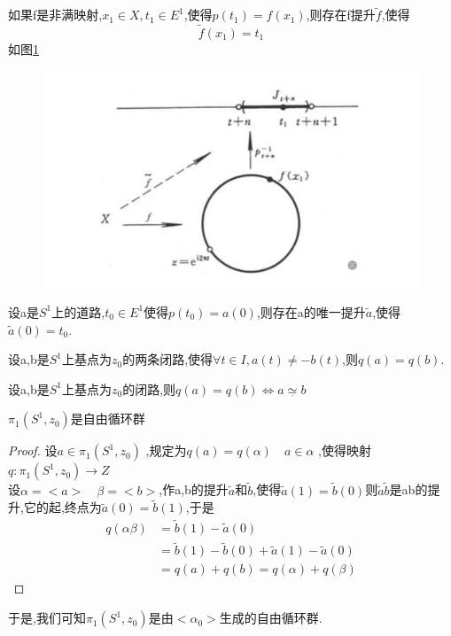 \begin{lemma}
    如果f是非满映射,\(x_1 \in X , t_1 \in E^1\),使得\(p(t_1) = f(x_1)\),则存在f提升\(\widetilde{f}\),使得\[\widetilde{f}(x_1) = t_1\]
    如图\ref{fig:enter-label_24}
    \begin{figure}[H]
        \centering
        \includegraphics[width=0.5\linewidth]{image_24.png}
        \caption{}
        \label{fig:enter-label_24}
    \end{figure}
\end{lemma}
\begin{lemma}
    设a是\(S^1\)上的道路,\(t_0 \in E^1\)使得\(p(t_0) = a(0)\),则存在a的唯一提升\(\widetilde{a}\),使得\(\widetilde{a}(0) = t_0\).
\end{lemma}
\begin{lemma}
    设a,b是\(S^1\)上基点为\(z_0\)的两条闭路,使得\(\forall t \in I , a(t) \neq -b(t) \),则\(q(a) = q(b) \).
\end{lemma}
\begin{lemma}
    设a,b是\(S^1\)上基点为\(z_0\)的闭路,则\(q(a) =q(b) \Leftrightarrow a \underset{.}{\simeq} b \)
\end{lemma}
\begin{theorem}
    \(\pi_1(S^1 ,z_0)\)是自由循环群
\end{theorem}
\begin{proof}
    设\(a \in \pi_1 (S^1 ,z_0 )\) ,规定为\(q(a) =q(\alpha) \quad a \in \alpha\) ,使得映射\(q : \pi_1 (S^1 ,z_0) \rightarrow Z \)\\
    设\(\alpha = <a > \quad \beta = <b> \),作a,b的提升\(\widetilde{a}\)和\(\widetilde{b}\),使得\(\widetilde{a}(1) = \widetilde{b}(0)\)则\(\widetilde{a}\widetilde{b}\)是ab的提升,它的起,终点为\(\widetilde{a}(0) = \widetilde{b}(1)\),于是\begin{align*}
        q(\alpha\beta)&= \widetilde{b}(1)  - \widetilde{a}(0) \\
        &= \widetilde{b}(1) - \widetilde{b}(0) + \widetilde{a}(1) -\widetilde{a}(0) \\
        &= q(a) +q(b) = q(\alpha) + q(\beta)
    \end{align*}
    
\end{proof}
于是,我们可知\(\pi_1 (S^1 ,z_0)\)是由\(<\alpha_0 > \)生成的自由循环群.
